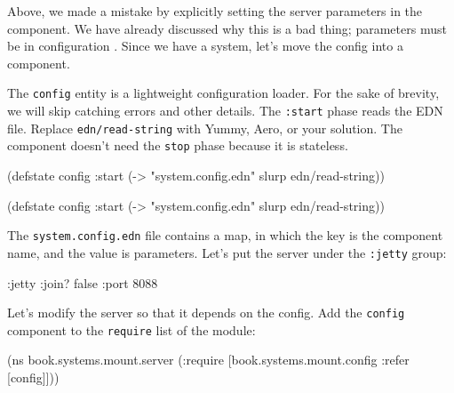 Above, we made a mistake by explicitly setting the server parameters in the component. We have already discussed why this is a bad thing; parameters must be in configuration . Since we have a system, let's move the config into a component.


The \verb|config| entity is a lightweight configuration loader. For the sake of brevity, we will skip catching errors and other details. The \verb|:start| phase reads the EDN file. Replace \texttt{edn/read\--string} with Yummy, Aero, or your solution. The component doesn't need the \verb|stop| phase because it is stateless.

\ifnarrow

\begin{english}
  \begin{clojure}
(defstate config
  :start
  (-> "system.config.edn"
      slurp
      edn/read-string))
  \end{clojure}
\end{english}

\else

\begin{english}
  \begin{clojure}
(defstate config
  :start
  (-> "system.config.edn" slurp edn/read-string))
  \end{clojure}
\end{english}

\fi

The \verb|system.config.edn| file contains a map, in which the key is the component name, and the value is parameters. Let's put the server under the \verb|:jetty| group:

\begin{english}
  \begin{clojure}
{:jetty {:join? false :port 8088}}
  \end{clojure}
\end{english}


Let's modify the server so that it depends on the config. Add the \verb|config| component to the \verb|require| list of the module:

\ifnarrow

\begin{english}
  \begin{clojure}
(ns book.systems.mount.server
 (:require
  [book.systems.mount.config
   :refer [config]]))
  \end{clojure}
\end{english}

